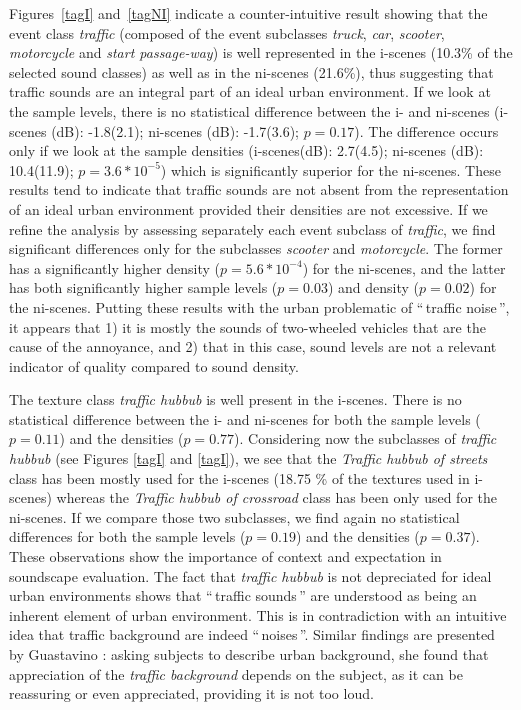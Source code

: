 \documentclass[12pt, titlepage, reqno]{article} %
\begin{document}
Figures~\ref{tagI} and~\ref{tagNI}  indicate a counter-intuitive result showing that the event class \textit{traffic} (composed of the event subclasses \textit{truck}, \textit{car}, \textit{scooter}, \textit{motorcycle} and \textit{start passage-way}) is well represented in the i-scenes (10.3\% of the selected sound classes) as well as in the ni-scenes (21.6\%), thus suggesting that traffic sounds are an integral part of an ideal urban environment. If we look at the sample levels, there is no statistical difference between the i- and ni-scenes (i-scenes (dB): -1.8(2.1); ni-scenes (dB): -1.7(3.6); $p=0.17$). The difference occurs only if we look at the sample densities (i-scenes(dB): 2.7(4.5); ni-scenes (dB): 10.4(11.9); $p=3.6*10^{-5}$) which is significantly superior for the ni-scenes. These results tend to indicate that traffic sounds are not absent from the representation of an ideal urban environment provided their densities are not excessive. If we refine the analysis by assessing separately each event subclass of \textit{traffic}, we find significant differences only for the subclasses \textit{scooter} and \textit{motorcycle}. The former has a significantly higher density  ($p=5.6*10^{-4}$) for the ni-scenes, and the latter has both significantly higher sample levels ($p=0.03$) and density ($p=0.02$) for the ni-scenes. Putting these results with the urban problematic of ``\,traffic noise\,'', it appears that 1) it is mostly the sounds of two-wheeled vehicles that are the cause of the annoyance, and  2) that in this case, sound levels are not a relevant indicator of quality compared to sound density.


The texture class \textit{traffic hubbub} is well present in the i-scenes. There is no statistical difference between the i- and ni-scenes for both the sample levels ($p = 0.11$) and the densities ($p = 0.77$). Considering now the subclasses of  \textit{traffic hubbub} (see Figures \ref{tagI} and \ref{tagI}), we see that the \textit{Traffic hubbub of streets} class has been mostly used for the i-scenes (18.75 \% of the textures used in i-scenes) whereas  the \textit{Traffic hubbub of crossroad} class has been only used for the ni-scenes. If we compare those two subclasses, we find again no statistical differences for both the sample levels ($p = 0.19$) and the densities ($p = 0.37$).
These observations  show the importance of context and expectation in soundscape evaluation. The fact that \textit{traffic hubbub} is not depreciated for ideal urban environments shows that ``\,traffic sounds\,'' are understood as being an inherent element of urban environment. This is in contradiction with an intuitive idea that traffic background are indeed ``\,noises\,''. Similar findings are presented by Guastavino \cite{guastavino_etude_2003}: asking subjects to describe urban background, she found that appreciation of the \textit{traffic background} depends on the subject, as it can be reassuring or even appreciated, providing it is not too loud.
\end{document}
